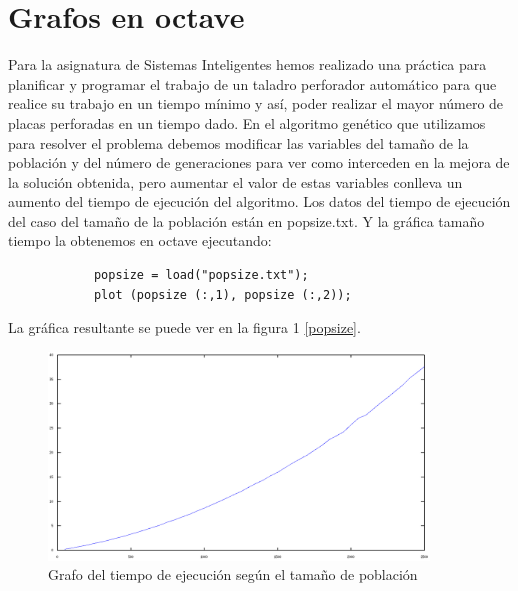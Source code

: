 \documentclass[a4,12pt,graphicx,caption,rotating]{article}
\begin{document}
\section{Grafos en octave}
Para la asignatura de Sistemas Inteligentes hemos realizado una práctica para planificar y programar el trabajo de un taladro perforador automático para que realice su trabajo en un tiempo mínimo y así, poder realizar el mayor número de placas perforadas en un tiempo dado.
En el algoritmo genético que utilizamos para resolver el problema debemos modificar las variables del tamaño de la población y del número de generaciones para ver como interceden en la mejora de la solución obtenida, pero aumentar el valor de estas variables conlleva un aumento del tiempo de ejecución del algoritmo.
Los datos del tiempo de ejecución del caso del tamaño de la población están en popsize.txt.
Y la gráfica tamaño tiempo la obtenemos en octave ejecutando:
\begin{verbatim}
            popsize = load("popsize.txt");
            plot (popsize (:,1), popsize (:,2));
\end{verbatim}
La gráfica resultante se puede ver en la figura 1 \ref{popsize}.
\begin{figure}[t]
\begin{center}
\includegraphics[width=0.9\textwidth]{graph/popsize}
\end{center}
\caption{Grafo del tiempo de ejecución según el tamaño de población}
\label{fig:popsize}
\end{figure}
\end{document}
